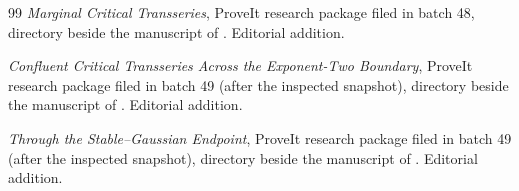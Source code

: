 \documentclass[11pt,a4paper]{article}
\numberwithin{equation}{section}
\theoremstyle{definition}\newtheorem{definition}[theorem]{Definition}
\theoremstyle{remark}\newtheorem{remark}[theorem]{Remark}
\theoremstyle{definition}
\begin{document}
\begin{thebibliography}{99}
\emph{Marginal Critical Transseries}, ProveIt research package filed in
batch 48, directory 
beside the manuscript of \cite{repo-critical}. Editorial addition.

\emph{Confluent Critical Transseries Across the Exponent-Two Boundary},
ProveIt research package filed in batch 49 (after the inspected snapshot),
directory 
beside the manuscript of \cite{repo-critical}. Editorial addition.

\emph{Through the Stable--Gaussian Endpoint}, ProveIt research package filed
in batch 49 (after the inspected snapshot), directory
 beside the
manuscript of \cite{repo-critical}. Editorial addition.
\end{thebibliography}
\end{document}
